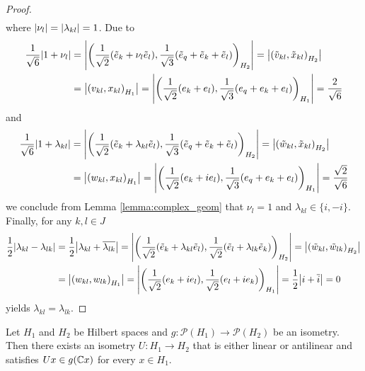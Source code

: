\begin{proof}
\begin{align*}
	\end{align*}
	where ${\left | \nu_l \right |} = {\left | \lambda_{kl} \right |} = 1$. Due to 
	\begin{align*}
		\frac{1}{\sqrt{6}}{\left | 1 + \nu_l \right |} &= {\left | {\left ( \frac{1}{\sqrt{2}}(\tilde{e}_k + \nu_l \tilde{e}_l), \frac{1}{\sqrt{3}}(\tilde{e}_q + \tilde{e}_k + \tilde{e}_l) \right )}_{H_2} \right |} = {\left | {\left ( \tilde{v}_{kl}, \tilde{x}_{kl} \right )}_{H_2} \right |} \\
		&= {\left | {\left ( v_{kl}, x_{kl} \right )}_{H_1} \right |} = {\left | {\left ( \frac{1}{\sqrt{2}}(e_k + e_l), \frac{1}{\sqrt{3}}(e_q + e_k + e_l) \right )}_{H_1} \right |} = \frac{2}{\sqrt{6}}
	\end{align*}
	and 
	\begin{align*}
		\frac{1}{\sqrt{6}}{\left | 1 + \lambda_{kl} \right |} &= {\left | {\left ( \frac{1}{\sqrt{2}}(\tilde{e}_k + \lambda_{kl} \tilde{e}_l), \frac{1}{\sqrt{3}}(\tilde{e}_q + \tilde{e}_k + \tilde{e}_l) \right )}_{H_2} \right |} = {\left | {\left ( \tilde{w}_{kl}, \tilde{x}_{kl} \right )}_{H_2} \right |} \\
		&= {\left | {\left ( w_{kl}, x_{kl} \right )}_{H_1} \right |} = {\left | {\left ( \frac{1}{\sqrt{2}}(e_k + i e_l), \frac{1}{\sqrt{3}}(e_q + e_k + e_l) \right )}_{H_1} \right |} = \frac{\sqrt{2}}{\sqrt{6}}
	\end{align*}
	we conclude from Lemma \ref{lemma:complex_geom} that $\nu_l = 1$ and $\lambda_{kl} \in \{i, -i\}$. Finally, for any $k,l \in J$
	\begin{align*}
		\frac{1}{2}{\left | \lambda_{kl} - \lambda_{lk} \right |} &= \frac{1}{2}{\left | \lambda_{kl} + \overline{\lambda_{lk}} \right |} = {\left | {\left ( \frac{1}{\sqrt{2}}(\tilde{e}_k + \lambda_{kl} \tilde{e}_l), \frac{1}{\sqrt{2}}(\tilde{e}_l + \lambda_{lk} \tilde{e}_k) \right )}_{H_2} \right |} = {\left | {\left ( \tilde{w}_{kl}, \tilde{w}_{lk} \right )}_{H_2} \right |} \\
		&= {\left | {\left ( w_{kl}, w_{lk} \right )}_{H_1} \right |} = {\left | {\left ( \frac{1}{\sqrt{2}}(e_k + i e_l), \frac{1}{\sqrt{2}}(e_l + i e_k) \right )}_{H_1} \right |} = \frac{1}{2} {\left | i + \overline{i} \right |} = 0
	\end{align*}
	yields $\lambda_{kl} = \lambda_{lk}$. 
\end{proof}


\begin{theorem}[Wigner] \label{theorem:wigner}
	Let $H_1$ and $H_2$ be Hilbert spaces and $g: \mathcal{P}(H_1) \to \mathcal{P}(H_2)$ be an isometry. Then there exists an isometry $U: H_1 \to H_2$ that is either linear or antilinear and satisfies $Ux \in g(\mathbb{C} x)$ for every $x \in H_1$. 
\end{theorem}

